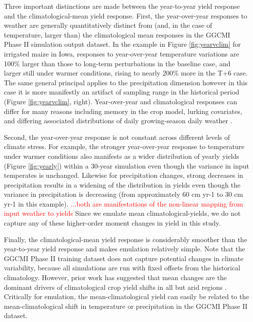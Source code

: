 \documentclass[gmd, manuscript]{copernicus} %
\begin{document}
Three important distinctions are made between the year-to-year yield response and the climatological-mean yield response.
First, the year-over-year responses to weather are generally quantitatively distinct from (and, in the case of temperature, larger than) the climatological mean responses in the GGCMI Phase II simulation output dataset. 
In the example in Figure \ref{fig:yearvclim} for irrigated maize in Iowa, responses to year-over-year temperature variations are 100\% larger than those to long-term perturbations in the baseline case, and larger still under warmer conditions, rising to nearly 200\% more in the T+6 case. 
The same general principal applies to the precipitation dimension however in this case it is more manifestly an artifact of sampling range in the historical period (Figure \ref{fig:yearvclim}, right).
Year-over-year and climatological responses can differ for many reasons including memory in the crop model, lurking covariates, and differing associated distributions of daily growing-season daily weather \citep[e.g.][]{Ruane2016}. 

Second, the year-over-year response is not constant across different levels of climate stress. 
For example, the stronger year-over-year response to temperature under warmer conditions also manifests as a wider distribution of yearly yields (Figure \ref{fig:yearly}) within a 30-year simulation even though the variance in input temperates is unchanged. 
Likewise for precipitation changes, strong decreases in precipitation results in a widening of the distribution in yields even though the variance in precipitation is decreasing (from approximately 60 cm yr-1 to 30 cm yr-1 in this example). 
\textcolor{red}{...both are manifestations of the non-linear mapping from input weather to yields}
Since we emulate mean climatological-yields, we do not capture any of these higher-order moment changes in yield in this study.

Finally, the climatological-mean yield response is considerably smoother than the year-to-year yield response and makes emulation relatively simple. 
Note that the GGCMI Phase II training dataset does not capture potential changes in climate variability, because all simulations are run with fixed offsets from the historical climatology.
However, prior work has suggested that mean changes are the dominant drivers of climatological crop yield shifts in all but arid regions \citep[e.g.][]{Glotter14}.
Critically for emulation, the mean-climatological yield can easily be related to the mean-climatological shift in temperature or precipitation in the GGCMI Phase II dataset.
\end{document}
